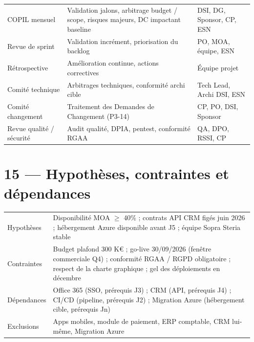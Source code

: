 \documentclass[11pt,a4paper,oneside]{report}
\begin{document}
\renewcommand{\arraystretch}{1.3}
\begin{tabularx}{\textwidth}{L{3.8cm} L{3.5cm} Y}
\toprule
{} &  &  \\
\midrule
COPIL mensuel     & Validation jalons, arbitrage budget / scope, risques majeurs, DC impactant baseline & DSI, DG, Sponsor, CP, ESN \\
Revue de sprint   & Validation incrément, priorisation du backlog                   & PO, MOA, équipe, ESN \\
Rétrospective     & Amélioration continue, actions correctives                      & Équipe projet \\
Comité technique  & Arbitrages techniques, conformité archi cible                   & Tech Lead, Archi DSI, ESN \\
Comité changement & Traitement des Demandes de Changement (P3-14)                   & CP, PO, DSI, Sponsor \\
Revue qualité / sécurité & Audit qualité, DPIA, pentest, conformité RGAA           & QA, DPO, RSSI, CP \\
\bottomrule
\end{tabularx}

\section*{15 — Hypothèses, contraintes et dépendances}

\renewcommand{\arraystretch}{1.3}
\begin{tabularx}{\textwidth}{L{3cm} Y}
\toprule
{} &  \\
\midrule
Hypothèses      & Disponibilité MOA $\geq$ 40\% ; contrats API CRM figés juin 2026 ; hébergement Azure disponible avant J5 ; équipe Sopra Steria stable \\
Contraintes     & Budget plafond 300 K€ ; go-live 30/09/2026 (fenêtre commerciale Q4) ; conformité RGAA / RGPD obligatoire ; respect de la charte graphique ; gel des déploiements en décembre \\
Dépendances     & Office 365 (SSO, prérequis J3) ; CRM (API, prérequis J4) ; CI/CD (pipeline, prérequis J2) ; Migration Azure (hébergement cible, prérequis Jn) \\
Exclusions      & Apps mobiles, module de paiement, ERP comptable, CRM lui-même, Migration Azure \\
\bottomrule
\end{tabularx}
\end{document}
